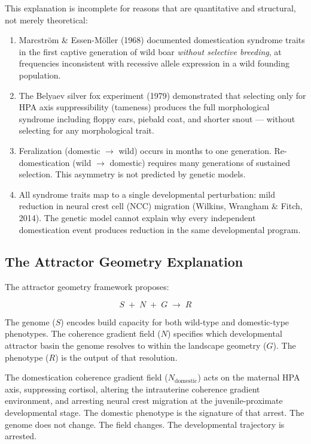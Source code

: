 \documentclass[10pt, a4paper]{article}
\begin{document}
This explanation is incomplete for reasons that are
quantitative and structural, not merely theoretical:

\begin{enumerate}[itemsep=0.2em]
  \item Marcstr\"{o}m \& Essen-M\"{o}ller (1968)
  documented domestication syndrome traits in the
  first captive generation of wild boar
  \textit{without selective breeding}, at
  frequencies inconsistent with recessive allele
  expression in a wild founding population.

  \item The Belyaev silver fox experiment (1979)
  demonstrated that selecting only for
  HPA axis suppressibility (tameness) produces
  the full morphological syndrome including floppy
  ears, piebald coat, and shorter snout ---
  without selecting for any morphological trait.

  \item Feralization (domestic $\rightarrow$ wild)
  occurs in months to one generation.
  Re-domestication (wild $\rightarrow$ domestic)
  requires many generations of sustained selection.
  This asymmetry is not predicted by genetic models.

  \item All syndrome traits map to a single
  developmental perturbation: mild reduction in
  neural crest cell (NCC) migration (Wilkins,
  Wrangham \& Fitch, 2014). The genetic model
  cannot explain why every independent
  domestication event produces reduction in the
  same developmental program.
\end{enumerate}

\subsection{The Attractor Geometry Explanation}

The attractor geometry framework proposes:

\[
  S \;+\; N \;+\; G \;\rightarrow\; R
\]

The genome ($S$) encodes build capacity for both
wild-type and domestic-type phenotypes.
The coherence gradient field ($N$) specifies
which developmental attractor basin the genome
resolves to within the landscape geometry ($G$).
The phenotype ($R$) is the output of that resolution.

The domestication coherence gradient field
($N_{\text{domestic}}$) acts on the maternal HPA
axis, suppressing cortisol, altering the intrauterine
coherence gradient environment, and arresting
neural crest migration at the
juvenile-proximate developmental stage.
The domestic phenotype is the signature of that
arrest. The genome does not change. The field
changes. The developmental trajectory is arrested.
\end{document}
